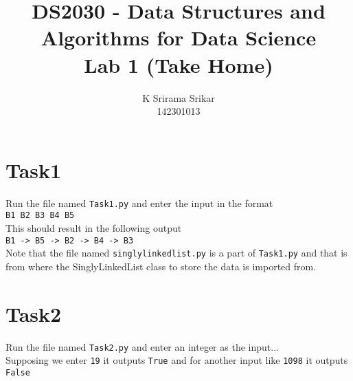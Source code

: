 \documentclass{article}
\title{\textbf{DS2030 - Data Structures and Algorithms for Data Science \\Lab 1 (Take Home)}}
\author{K Srirama Srikar \\142301013 }
\date{}
\begin{document}
\maketitle

\section{Task1}
Run the file named \texttt{Task1.py} and enter the input in the format \\ \texttt{B1 B2 B3 B4 B5} \\
This should result in the following output \\\texttt{B1 -> B5 -> B2 -> B4 -> B3}\\
Note that the file named \texttt{singlylinkedlist.py} is a part of \texttt{Task1.py} and that is from where the SinglyLinkedList class to store the data is imported from.
\section{Task2}
Run the file named \texttt{Task2.py} and enter an integer as the input...\\ Supposing we enter \texttt{19} it outputs \texttt{True} and for another input like \texttt{1098} it outputs \texttt{False}
\end{document}
